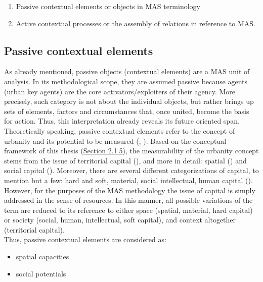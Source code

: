 \documentclass[11pt]{report}
\begin{document}
\begin{enumerate}
\item Passive contextual elements or objects in MAS terminology
\item Active contextual processes or the assembly of relations in reference to MAS.
\end{enumerate}

\subsection{Passive contextual elements}

As already mentioned, passive objects (contextual elements) are a MAS unit of analysis.
In its methodological scope, they are assumed passive because agents (urban key agents) are the core activators/exploiters of their agency.
More precisely, such category is not about the individual objects, but rather brings up sets of elements, factors and circumstances that, once united, become the basis for action. Thus, this interpretation already reveals its future oriented span. 
\\

Theoretically speaking, passive contextual elements refer to the concept of urbanity and its potential to be measured (\citealt{marcus_spatial_2007}; \citealt{vujosevic_postsocijalisticka_2010}).
Based on the conceptual framework of this thesis (\href{Section 2.1.5}{Section 2.1.5}),
the measurability of the urbanity concept stems from the issue of territorial capital (\citealt{camagni_regional_2013}), and more in detail: spatial (\citealt{marcus_spatial_2007}) and social capital (\citealt{golubovic_mrezna_2009}).
Moreover, there are several different categorizations of capital, to mention but a few: hard and soft, material, social intellectual, human capital  (\citealt{healey_collaborative_1997}). %
\\

However, for the purposes of the MAS methodology the issue of capital is simply addressed in the sense of resources.
In this manner, all possible variations of the term are reduced to its reference to either space (spatial, material, hard capital) or society (social, human, intellectual, soft capital), and context altogether (territorial capital).
\\

Thus, passive contextual elements are considered as:
\begin{itemize}
\item spatial capacities
\item social potentials
\end{itemize}
\end{document}
